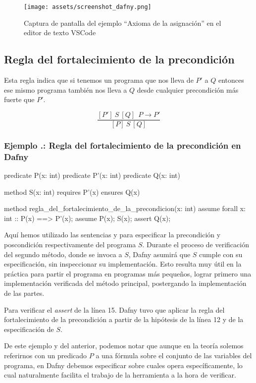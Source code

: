 \documentclass[12pt, a4paper, openany, fleqn]{book}
\newcounter{example}[chapter]
\renewcommand{\theexample}{\thechapter.\arabic{example}}
\newcommand{\example}[1]{
  \refstepcounter{example} %
  \subsubsection*{Ejemplo \theexample: #1}
}
\newcommand{\hoareTheorem}[3]{\ensuremath{[#1]\ #2\ [#3]}}
\newcommand{\inferenceRule}[2]{
    \begin{equation*}
        \frac{#1}{#2}
    \end{equation*}
}
\begin{document}
    \begin{figure}[h!]
        \centering
        \texttt{[image: assets/screenshot\_dafny.png]}  %
        \caption{Captura de pantalla del ejemplo ``Axioma de la asignación'' en el editor de texto VSCode}
        \label{fig:screenshot}
    \end{figure}

    \subsection{Regla del fortalecimiento de la precondición}
    Esta regla indica que si tenemos un programa que nos lleva de $P'$ a $Q$ entonces ese mismo programa también nos lleva a $Q$ desde cualquier precondición más fuerte que $P'$.
    \inferenceRule{\hoareTheorem{P'}{S}{Q}\ \ P \rightarrow P'}{\hoareTheorem{P}{S}{Q}}

    \example{Regla del fortalecimiento de la precondición en Dafny}
    \begin{greenbox}
    \begin{dafny}[gobble=8]
        predicate P(x: int)
        predicate P'(x: int)
        predicate Q(x: int)

        method S(x: int)
            requires P'(x)
            ensures Q(x)

        method regla_del_fortalecimiento_de_la_precondicion(x: int)
        {
            assume forall x: int :: P(x) ==> P'(x);
            assume P(x);
            S(x);
            assert Q(x); 
        }
    \end{dafny}
    \end{greenbox}
    Aquí hemos utilizado las sentencias  y  para especificar la precondición y poscondición respectivamente del programa $S$. Durante el proceso de verificación del segundo método, donde se invoca a $S$, Dafny asumirá que $S$ cumple con su especificación, sin inspeccionar su implementación. Esto resulta muy útil en la práctica para partir el programa en programas más pequeños, lograr primero una implementación verificada del método principal, postergando la implementación de las partes.

    Para verificar el \textit{assert} de la línea 15. Dafny tuvo que aplicar la regla del fortalecimiento de la precondición a partir de la hipótesis de la línea 12 y de la especificación de $S$.

    De este ejemplo y del anterior, podemos notar que aunque en la teoría solemos referirnos con un predicado $P$ a una fórmula sobre el conjunto de las variables del programa, en Dafny debemos especificar sobre cuales opera específicamente, lo cual naturalmente facilita el trabajo de la herramienta a la hora de verificar.
\end{document}

